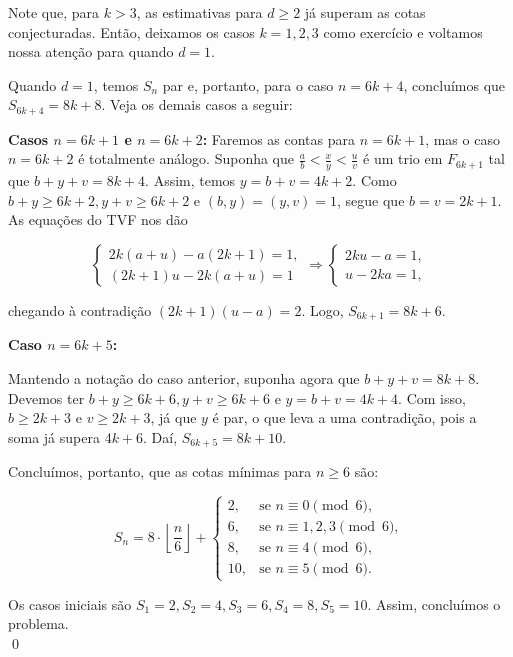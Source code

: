 \documentclass{hipatia}
\theoremstyle{definition} %
\begin{document}
Note que, para \(k > 3\), as estimativas para \(d \geq 2\) já superam as cotas conjecturadas. Então, deixamos os casos \(k = 1, 2, 3\) como exercício e voltamos nossa atenção para quando \(d = 1\).

Quando \(d = 1\), temos \(S_n\) par e, portanto, para o caso \(n = 6k+4\), concluímos que \(S_{6k+4} = 8k+8\). Veja os demais casos a seguir:

\textbf{Casos \(n = 6k+1\) e \(n = 6k+2\):}
Faremos as contas para \(n = 6k+1\), mas o caso \(n = 6k+2\) é totalmente análogo. Suponha que \(\frac{a}{b} < \frac{x}{y} < \frac{u}{v}\) é um trio em \(F_{6k+1}\) tal que \(b + y + v = 8k + 4\). Assim, temos \(y = b + v = 4k + 2\). Como \(b + y \geq 6k + 2, y + v \geq 6k + 2\) e \((b, y) = (y, v) = 1\), segue que \(b = v = 2k+1\). As equações do TVF nos dão

$$
\left\{
\begin{array}{l}
2k(a + u) - a(2k+1) = 1, \\
(2k+1)u - 2k(a + u) = 1
\end{array}
\right.
\Rightarrow
\left\{
\begin{array}{l}
2ku - a = 1, \\
u - 2ka = 1,
\end{array}
\right.
$$

\noindent chegando à contradição \((2k+1)(u-a) = 2\). Logo, \(S_{6k+1} = 8k+6\).

\textbf{Caso \(n = 6k+5\):}

Mantendo a notação do caso anterior, suponha agora que \(b + y + v = 8k + 8\). Devemos ter \(b + y \geq 6k + 6, y + v \geq 6k + 6\) e \(y = b + v = 4k + 4\). Com isso, \(b \geq 2k+3\) e \(v \geq 2k+3\), já que \(y\) é par, o que leva a uma contradição, pois a soma já supera \(4k+6\). Daí, \(S_{6k+5} = 8k+10\).

Concluímos, portanto, que as cotas mínimas para \(n \geq 6\) são:

\[
S_n = 8 \cdot \left\lfloor \frac{n}{6} \right\rfloor + 
\begin{cases} 
2, & \text{se } n \equiv 0 \pmod{6}, \\
6, & \text{se } n \equiv 1, 2, 3 \pmod{6}, \\
8, & \text{se } n \equiv 4 \pmod{6}, \\
10, & \text{se } n \equiv 5 \pmod{6}.
\end{cases}
\]

Os casos iniciais são \(S_1 = 2, S_2 = 4, S_3 = 6, S_4 = 8, S_5 = 10\). Assim, concluímos o problema.\\
\qed
\end{document}

